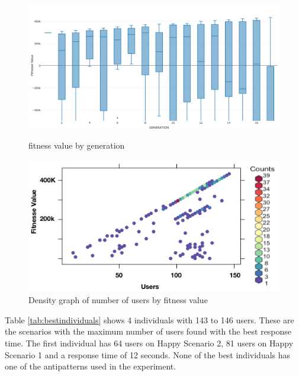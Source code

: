 \documentclass[times]{stvrauth}
\begin{document}
\begin{figure}[h]
\begin{minipage}{.5\textwidth}
\centering
\includegraphics[width=1\textwidth]{./images/experiment1-5.png}
\caption{fitness value by generation}
\label{fig:summaryboxplot1}
\end{minipage}
\begin{minipage}{.5\textwidth}
\centering
\includegraphics[width=1\textwidth]{./images/experiment1-6.png}
\caption{Density graph of number of users by fitness value}
\label{fig:density1}
\end{minipage}
\end{figure}

Table \ref{tab:bestindividuals} shows 4 individuals with 143 to 146 users. These are the scenarios with the maximum number of users found with the best response time. The first individual has 64 users on Happy Scenario 2, 81 users on Happy Scenario 1 and a response time of 12 seconds. None of the best individuals has one of the antipatterns used in the experiment.
\end{document}
